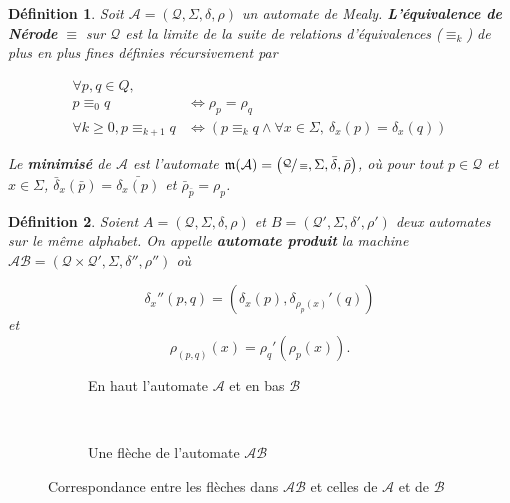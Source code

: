 \documentclass[11pt,a4paper]{article}
\newtheorem{definition}{Définition}
\begin{document}
\begin{definition}
  Soit $\mathcal{A}=\left(\mathcal{Q}, \Sigma, \delta, \rho\right)$ un automate de Mealy. \textbf{L'équivalence de Nérode} $\equiv$ sur $\mathcal{Q}$ est la limite de la suite de relations d'équivalences ($\equiv_k$) de plus en plus fines définies récursivement par

  \begin{align*}
    \forall p, q \in Q,\\
    p \equiv_0 q &\iff \rho_p = \rho_q \\
    \forall k \geq 0, p \equiv_{k+1}q &\iff \left(p\equiv_kq \wedge \forall x \in \Sigma,~\delta_x(p)=\delta_x(q)\right)
  \end{align*}

  Le \textbf{minimisé} de $\mathcal{A}$ est l'automate $\mathfrak{m}(\mathcal{A})=\left(\sfrac{\mathcal{Q}}{\equiv}, \Sigma, \bar{\delta}, \bar{\rho}\right)$, où pour tout $p\in\mathcal{Q}$ et $x\in\Sigma$, $\bar{\delta}_x(\bar{p}) = \bar{\delta_x(p)}$ et $\bar{\rho}_{\bar{p}} =  \rho_p$.
\end{definition}

\begin{definition}
  \label{def:produit}
  Soient $A = \left(\mathcal{Q}, \Sigma, \delta, \rho\right)$ et $B = \left(\mathcal{Q'}, \Sigma, \delta', \rho'\right)$ deux automates sur le même alphabet. On appelle \textbf{\textit{automate produit}} la machine $\mathcal{AB} = \left(\mathcal{Q}\times\mathcal{Q'}, \Sigma, \delta'', \rho''\right)$ où

\[ \delta_x''(p, q) = (\delta_x(p), \delta_{\rho_p(x)}'(q))\]
et
\[ \rho_{(p,q)}(x) = \rho_q'(\rho_p(x)). \]
\end{definition}

\begin{figure}[h!]
  \begin{subfigure}[b]{0.5\textwidth}
    \centering
    \caption{En haut l'automate $\mathcal{A}$ et en bas $\mathcal{B}$}
  \end{subfigure}
  ~
  \begin{subfigure}[b]{0.5\textwidth}
    \centering
    \caption{Une flèche de l'automate $\mathcal{AB}$}
  \end{subfigure}
  \caption{Correspondance entre les flèches dans $\mathcal{AB}$ et celles de $\mathcal{A}$ et de $\mathcal{B}$}
\end{figure}
\end{document}
